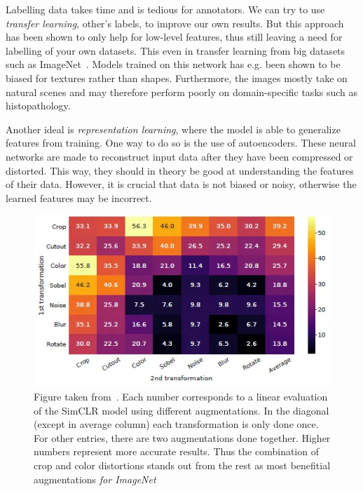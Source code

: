 \documentclass[10pt,twocolumn,letterpaper]{article}
\begin{document}
Labelling data takes time and is tedious for annotators. We can try to use \textit{transfer learning}, other's labels, to improve our own results. But this approach has been shown to only help for low-level features, thus still leaving a need for labelling of your own datasets. This even in transfer learning from big datasets such as ImageNet~\cite{imageNet}. Models trained on this network has e.g. been shown to be biased for textures rather than shapes. Furthermore, the images mostly take on natural scenes and may therefore perform poorly on domain-specific tasks such as histopathology.

Another ideal is \textit{representation learning}, where the model is able to generalize features from training. One way to do so is the use of autoencoders. These neural networks are made to reconstruct input data after they have been compressed or distorted. This way, they should in theory be good at understanding the features of their data. However, it is crucial that data is not biased or noisy, otherwise the learned features may be incorrect.

\begin{figure}\label{fig:simCLR}
  \includegraphics[scale=.5]{simCLR.png}
  \caption{Figure taken from~\cite{simCLR}. Each number corresponds to a linear evaluation of the SimCLR model using different augmentations. In the diagonal (except in average column) each transformation is only done once. For other entries, there are two augmentations done together. Higher numbers represent more accurate results. Thus the combination of crop and color distortions stands out from the rest as most benefitial augmentations \textit{for ImageNet}}
\end{figure}
\end{document}
